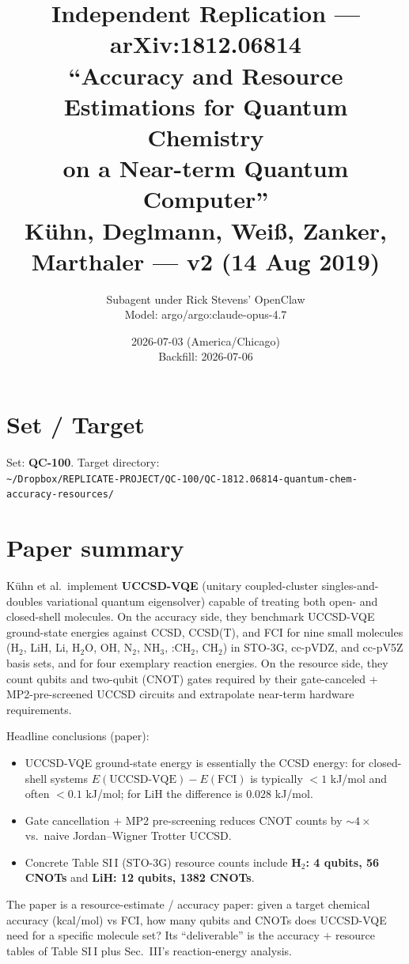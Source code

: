 \documentclass[11pt]{article}
\title{Independent Replication --- arXiv:1812.06814\\
\large ``Accuracy and Resource Estimations for Quantum Chemistry\\ on a Near-term Quantum Computer''\\
K\"uhn, Deglmann, Wei\ss, Zanker, Marthaler --- v2 (14 Aug 2019)}
\author{Subagent under Rick Stevens' OpenClaw\\ Model: argo/argo:claude-opus-4.7}
\date{2026-07-03 (America/Chicago)\\
Backfill: 2026-07-06}
\begin{document}
\maketitle

\section*{Set / Target}
Set: \textbf{QC-100}. Target directory:\\
\texttt{\~{}/Dropbox/REPLICATE-PROJECT/QC-100/QC-1812.06814-quantum-chem-accuracy-resources/}

\section{Paper summary}

K\"uhn et al.\ implement \textbf{UCCSD-VQE} (unitary coupled-cluster
singles-and-doubles variational quantum eigensolver) capable of treating both
open- and closed-shell molecules. On the accuracy side, they benchmark
UCCSD-VQE ground-state energies against CCSD, CCSD(T), and FCI for nine small
molecules (H$_2$, LiH, Li, H$_2$O, OH, N$_2$, NH$_3$, :CH$_2$, CH$_2$) in
STO-3G, cc-pVDZ, and cc-pV5Z basis sets, and for four exemplary reaction
energies. On the resource side, they count qubits and two-qubit (CNOT) gates
required by their gate-canceled + MP2-pre-screened UCCSD circuits and
extrapolate near-term hardware requirements.

Headline conclusions (paper):
\begin{itemize}
  \item UCCSD-VQE ground-state energy is essentially the CCSD energy: for
        closed-shell systems $E(\text{UCCSD-VQE}) - E(\text{FCI})$ is
        typically $<1$ kJ/mol and often $<0.1$ kJ/mol; for LiH the
        difference is $0.028$ kJ/mol.
  \item Gate cancellation $+$ MP2 pre-screening reduces CNOT counts by
        $\sim 4\times$ vs.\ naive Jordan--Wigner Trotter UCCSD.
  \item Concrete Table SI\,I (STO-3G) resource counts include
        \textbf{H$_2$: 4 qubits, 56 CNOTs} and \textbf{LiH: 12 qubits, 1382 CNOTs}.
\end{itemize}

The paper is a resource-estimate / accuracy paper: given a target chemical
accuracy (kcal/mol) vs FCI, how many qubits and CNOTs does UCCSD-VQE need
for a specific molecule set? Its ``deliverable'' is the accuracy $+$ resource
tables of Table SI\,I plus Sec.\ III's reaction-energy analysis.
\end{document}
